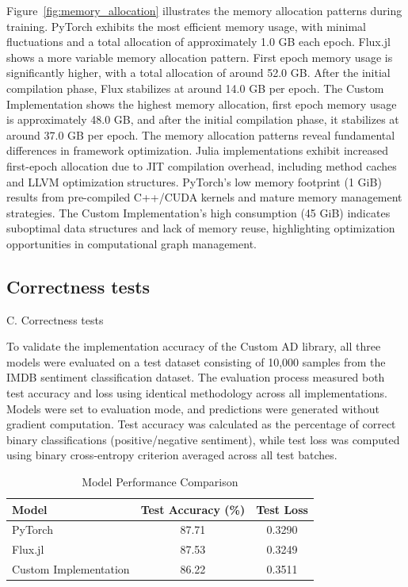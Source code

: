 \documentclass[conference]{IEEEtran}
\begin{document}
Figure~\ref{fig:memory_allocation} illustrates the memory allocation patterns during 
training. PyTorch exhibits the most efficient memory usage,
with minimal fluctuations and a total allocation of approximately 1.0 GB each epoch.
Flux.jl shows a more variable memory allocation pattern. First epoch memory usage is 
significantly higher, with a total allocation of around 52.0 GB. 
After the initial compilation phase, Flux stabilizes at around 14.0 GB per epoch.
The Custom Implementation shows the highest memory allocation, first epoch memory usage is
approximately 48.0 GB, and after the initial compilation phase, it stabilizes at around 37.0 GB per epoch.
The memory allocation patterns reveal fundamental differences in framework optimization. 
Julia implementations exhibit increased first-epoch allocation due to JIT compilation overhead, 
including method caches and LLVM optimization structures. PyTorch's low memory footprint 
(1 GiB) results from pre-compiled C++/CUDA kernels and mature memory management strategies. 
The Custom Implementation's high consumption (45 GiB) indicates suboptimal data structures 
and lack of memory reuse, highlighting optimization opportunities in computational graph management.


\subsection{Correctness tests}

C. Correctness tests

To validate the implementation accuracy of the Custom AD library, all three models were evaluated 
on a test dataset consisting of 10,000 samples from the IMDB sentiment classification dataset. 
The evaluation process measured both test accuracy and loss using identical methodology across 
all implementations. Models were set to evaluation mode, and predictions were generated without 
gradient computation. Test accuracy was calculated as the percentage of correct binary 
classifications (positive/negative sentiment), while test loss was computed using binary 
cross-entropy criterion averaged across all test batches.

\begin{table}[h]
\centering
\caption{Model Performance Comparison}
\begin{tabular}{|l|c|c|}
\hline
\textbf{Model} & \textbf{Test Accuracy (\%)} & \textbf{Test Loss} \\
\hline
PyTorch & 87.71 & 0.3290 \\
\hline
Flux.jl & 87.53 & 0.3249 \\
\hline
Custom Implementation & 86.22 & 0.3511 \\
\hline
\end{tabular}
\label{tab:model_comparison}
\end{table}
\end{document}
